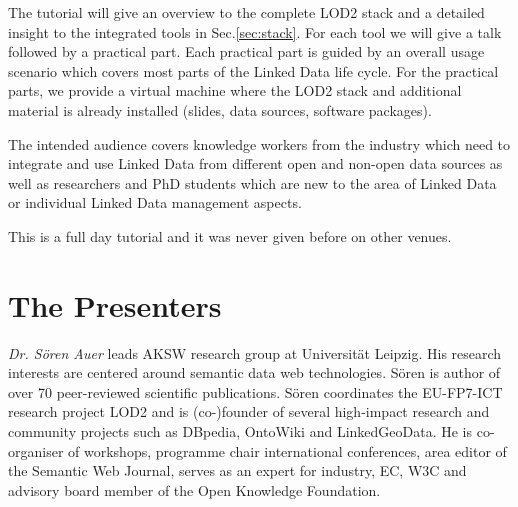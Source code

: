 \documentclass[a4paper, 11pt]{llncs}
\begin{document}

The tutorial will give an overview to the complete LOD2 stack and a detailed insight to the integrated tools in Sec.\ref{sec:stack}.
For each tool we will give a talk followed by a practical part.
Each practical part is guided by an overall usage scenario which covers most parts of the Linked Data life cycle.
For the practical parts, we provide a virtual machine where the LOD2 stack and additional material is already installed (slides, data sources, software packages).

The intended audience covers knowledge workers from the industry which need to integrate and use Linked Data from different open and non-open data sources as well as researchers and PhD students which are new to the area of Linked Data or individual Linked Data management aspects.

This is a full day tutorial and it was never given before on other venues.


    

\section{The Presenters}


\emph{Dr. S\"oren Auer} leads AKSW research group at Universit\"at Leipzig.
His research interests are centered around semantic data web technologies.
S\"oren is author of over 70 peer-reviewed scientific publications.
S\"oren coordinates the EU-FP7-ICT research project LOD2 and is (co-)founder of several high-impact research and community projects such as DBpedia, OntoWiki and LinkedGeoData.
He is co-organiser of workshops, programme chair international conferences, area editor of the Semantic Web Journal, serves as an expert for industry, EC, W3C and advisory board member of the Open Knowledge Foundation.
\end{document}
